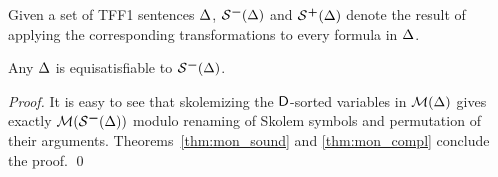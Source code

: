 Given a set of TFF1 sentences $\mathrm{\Delta}$,
$\SKOM(\DEL)$ and $\mathcal{S}\text{\textsuperscript{\kern.1ex\bfseries+}}(\mathrm{\Delta})$ denote the result of applying
the corresponding transformations to every formula in $\mathrm{\Delta}$.

\begin{theorem} \label{thm:sko}
Any\/ $\mathrm{\Delta}$ is equisatisfiable to $\SKOM(\DEL)$.
\end{theorem}
\begin{proof}
It is easy to see that
skolemizing the $\mathsf{D}$-sorted variables in $\mathcal{M}(\mathrm{\Delta})$ gives
exactly $\MON(\SKOM(\DEL))$ modulo renaming of Skolem symbols and
permutation of their arguments. Theorems~\ref{thm:mon_sound} and
\ref{thm:mon_compl} conclude the proof.
\qed
\end{proof}

%

